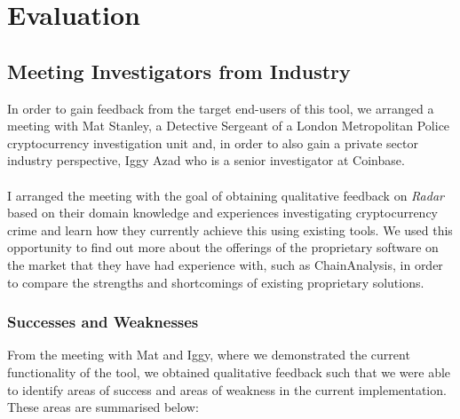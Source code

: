 \chapter{Evaluation}
\section{Meeting Investigators from Industry} 
In order to gain feedback from the target end-users of this tool, we arranged a meeting with Mat Stanley, a Detective Sergeant of a London Metropolitan Police cryptocurrency investigation unit and, in order to also gain a private sector industry perspective, Iggy Azad who is a senior investigator at Coinbase.
\\\\
I arranged the meeting with the goal of obtaining qualitative feedback on \textit{Radar} based on their domain knowledge and experiences investigating cryptocurrency crime and learn how they currently achieve this using existing tools. We used this opportunity to find out more about the offerings of the proprietary software on the market that they have had experience with, such as ChainAnalysis, in order to compare the strengths and shortcomings of existing proprietary solutions.

\subsection{Successes and Weaknesses}
From the meeting with Mat and Iggy, where we demonstrated the current functionality of the tool, we obtained qualitative feedback such that we were able to identify areas of success and areas of weakness in the current implementation. These areas are summarised below:

